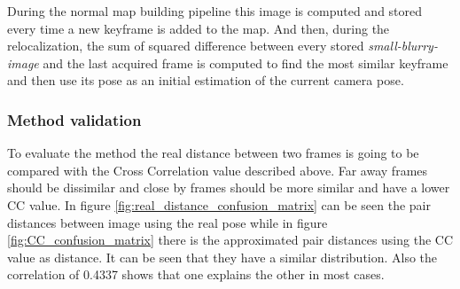 During the normal map building pipeline this image is computed and stored every time a new keyframe is added to the map. And then, during the relocalization, the sum of squared difference between every stored \textit{small-blurry-image} and the last acquired frame is computed to find the most similar keyframe and then use its pose as an initial estimation of the current camera pose.\\

\subsubsection{Method validation}
\label{ssub:cc_method_validation}

To evaluate the method the real distance between two frames is going to be compared with the Cross Correlation value described above. Far away frames should be dissimilar and close by frames should be more similar and have a lower CC value. In figure \ref{fig:real_distance_confusion_matrix} can be seen the pair distances between image using the real pose while in figure \ref{fig:CC_confusion_matrix} there is the approximated pair distances using the CC value as distance. It can be seen that they have a similar distribution. Also the correlation of 0.4337 shows that one explains the other in most cases.\\

